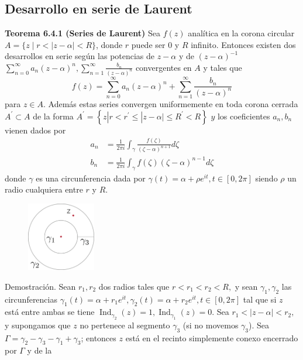 \documentclass[a4paper, 11pt]{extarticle}
\newcommand{\tma}[1]{\textcolor{rojo}{\textbf{Teorema #1}}}
\newcommand{\dem}[1]{\textcolor{gris}{\small{Demostración. #1}}}
\begin{document}
\begin{multicols*}{2}
\subsection*{Desarrollo en serie de Laurent}
\label{sec:org81987f0}
\vspace{-1em}
\tma{6.4.1 (Series de Laurent)} Sea \(f(z)\) analítica en la corona circular
\(A = \{ z \;|\; r < |z-\alpha| < R \}\), donde \(r\) puede ser 0 y \(R\)
infinito. 
Entonces existen dos desarrollos en serie
según las potencias de \(z-\alpha\) y de \((z-\alpha)^{-1}\)
\(\sum_{n=0}^{\infty} a_{n}(z-\alpha)^{n}, \sum_{n=1}^{\infty} \frac{b_{n}}{(z-\alpha)^{n}}\)
convergentes en \(A\) y tales que
$$
f(z)=\sum_{n=0}^{\infty} a_{n}(z-\alpha)^{n}+\sum_{n=1}^{\infty} \frac{b_{n}}{(z-\alpha)^{n}}
$$
para \(z \in A\). Además estas series convergen uniformemente en toda corona
cerrada \(A^{\prime} \subset A\) de la forma \(A^{\prime}=\left\{z\left|r<r^{\prime} \leq\right| z-\alpha | \leq
R^{\prime}<R\right\}\)
\(y\) los coeficientes \(a_{n}, b_{n}\) vienen dados por
\[\begin{aligned}
a_{n} &=\frac{1}{2 \pi i} \int_{\gamma} \frac{f(\zeta)}{(\zeta-\alpha)^{n+1}} d \zeta \\
b_{n} &=\frac{1}{2 \pi i} \int_{\gamma} f(\zeta)(\zeta-\alpha)^{n-1} d \zeta
\end{aligned}\]
donde \(\gamma\) es una circunferencia dada por \(\gamma(t)=\alpha+\rho e^{i t}, t \in[0,2 \pi]\)
siendo \(\rho\) un radio cualquiera entre \(r\) y \(R\).
\begin{figure}[H]
\centering
\includegraphics[width=3cm]{imagenes/laurent.png}
\end{figure}
\dem{Sean $r_{1}, r_{2}$ dos radios tales que $r<r_{1}<r_{2}<R,$ y sean $\gamma_{1}, \gamma_{2}$ las circunferencias
$
\gamma_{1}(t)=\alpha+r_{1} e^{i t}, \gamma_{2}(t)=\alpha+r_{2} e^{i t}, t \in[0,2 \pi]
$
tal que si $z$ está entre ambas se tiene
 $\operatorname{Ind}_{\gamma_{2}}(z)=1, \operatorname{Ind}_{\gamma_{1}}(z)=0$.
Sea $r_{1}<|z-\alpha|<r_{2},$ y supongamos que $z$ no pertenece al segmento $\gamma_{3}$ (si no movemos $\gamma_3$).
Sea $\Gamma=\gamma_{2}-\gamma_{3}-\gamma_{1}+\gamma_{3}$; entonces $z$ está en el recinto simplemente
 conexo encerrado por $\Gamma$ y de la 
}
\end{multicols*}
\end{document}
